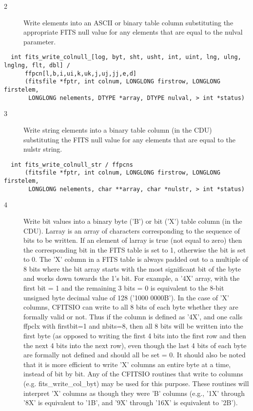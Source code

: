 \documentclass[11pt]{book}
\begin{document}
\begin{description}
\item[2 ] Write elements into an ASCII or binary table column
    substituting the appropriate FITS null value for any elements that
    are equal to the nulval parameter.    \label{ffpcnx}
\end{description}

\begin{verbatim}
  int fits_write_colnull_[log, byt, sht, usht, int, uint, lng, ulng, lnglng, flt, dbl] /
      ffpcn[l,b,i,ui,k,uk,j,uj,jj,e,d]
      (fitsfile *fptr, int colnum, LONGLONG firstrow, LONGLONG firstelem,
       LONGLONG nelements, DTYPE *array, DTYPE nulval, > int *status)
\end{verbatim}

\begin{description}
\item[3 ] Write string elements into a binary table column (in the CDU)
    substituting the FITS null value for any elements that
   are equal to the nulstr string.  \label{ffpcns}
\end{description}

\begin{verbatim}
  int fits_write_colnull_str / ffpcns
      (fitsfile *fptr, int colnum, LONGLONG firstrow, LONGLONG firstelem,
       LONGLONG nelements, char **array, char *nulstr, > int *status)
\end{verbatim}

\begin{description}
\item[4 ] Write bit values into a binary byte ('B') or bit ('X') table column (in
    the CDU).  Larray is an array of characters corresponding to the
    sequence of bits to be written.  If an element of larray is true
    (not equal to zero) then the corresponding bit in the FITS table is
    set to 1, otherwise the bit is set to 0.  The 'X' column in a FITS
    table is always padded out to a multiple of 8 bits where the bit
    array starts with the most significant bit of the byte and works
    down towards the 1's bit.  For example, a '4X' array, with the
    first bit = 1 and the remaining 3 bits = 0 is equivalent to the 8-bit
    unsigned byte decimal value of 128  ('1000 0000B').  In the case of
    'X' columns, CFITSIO can write to all 8 bits of each byte whether
    they are formally valid or not.  Thus if the column is defined as
    '4X', and one calls ffpclx with firstbit=1 and nbits=8, then all
    8 bits will be written into the first byte (as opposed to writing
    the first 4 bits into the first row and then the next 4 bits into
    the next row), even though the last 4 bits of each byte are formally
    not defined and should all be set = 0.  It should also be noted that
    it is more efficient to write 'X' columns an entire byte at a time,
    instead of bit by bit.  Any of the CFITSIO routines that write to
    columns (e.g. fits\_write\_col\_byt) may be used for this purpose.
    These routines will interpret 'X' columns as though they were 'B'
    columns (e.g.,  '1X' through '8X' is equivalent
   to '1B', and '9X' through '16X' is equivalent to '2B').  \label{ffpclx}
\end{description}
\end{document}
